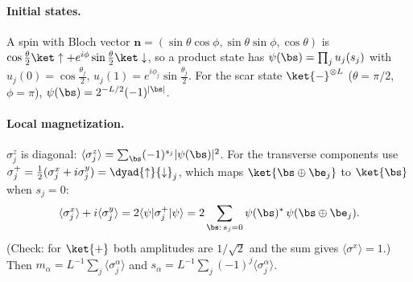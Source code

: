 \paragraph{Initial states.} A spin with Bloch vector $\mathbf n = (\sin\theta\cos\phi, \sin\theta\sin\phi, \cos\theta)$ is $\cos\tfrac\theta2\ket\uparrow + e^{i\phi}\sin\tfrac\theta2\ket\downarrow$, so a product state has $\psi(\bs) = \prod_j u_j(s_j)$ with $u_j(0) = \cos\tfrac{\theta_j}2$, $u_j(1) = e^{i\phi_j}\sin\tfrac{\theta_j}2$. For the scar state $\ket{-}^{\otimes L}$ ($\theta = \pi/2$, $\phi = \pi$), $\psi(\bs) = 2^{-L/2}(-1)^{\lvert\bs\rvert}$.

\paragraph{Local magnetization.} $\sigma^z_j$ is diagonal: $\langle\sigma^z_j\rangle = \sum_{\bs}(-1)^{s_j}\lvert\psi(\bs)\rvert^2$. For the transverse components use $\sigma^+_j = \tfrac12(\sigma^x_j + i\sigma^y_j) = \dyad{\uparrow}{\downarrow}_j$, which maps $\ket{\bs\oplus\be_j}$ to $\ket{\bs}$ when $s_j = 0$:
\begin{equation}
\langle\sigma^x_j\rangle + i\langle\sigma^y_j\rangle = 2\langle\psi\vert\sigma^+_j\vert\psi\rangle = 2\sum_{\bs:\,s_j = 0}\psi(\bs)^*\,\psi(\bs\oplus\be_j).
\end{equation}
(Check: for $\ket{+}$ both amplitudes are $1/\sqrt2$ and the sum gives $\langle\sigma^x\rangle = 1$.) Then $m_\alpha = L^{-1}\sum_j\langle\sigma^\alpha_j\rangle$ and $s_\alpha = L^{-1}\sum_j(-1)^j\langle\sigma^\alpha_j\rangle$.

